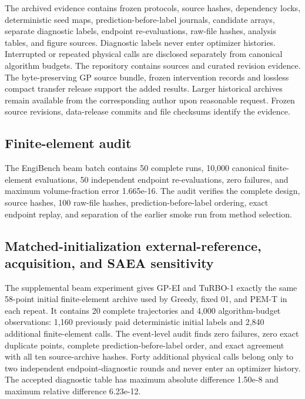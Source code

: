 \documentclass[suppldata]{interact}
\begin{document}
The archived evidence contains frozen protocols, source hashes, dependency locks, deterministic seed maps, prediction-before-label journals, candidate arrays, separate diagnostic labels, endpoint re-evaluations, raw-file hashes, analysis tables, and figure sources. Diagnostic labels never enter optimizer histories. Interrupted or repeated physical calls are disclosed separately from canonical algorithm budgets. The repository contains sources and curated revision evidence. The byte-preserving GP source bundle, frozen intervention records and lossless compact transfer release support the added results. Larger historical archives remain available from the corresponding author upon reasonable request. Frozen source revisions, data-release commits and file checksums identify the evidence.

\hypertarget{finite-element-audit}{%
\subsection{Finite-element audit}\label{finite-element-audit}}

The EngiBench beam batch contains 50 complete runs, 10,000 canonical finite-element evaluations, 50 independent endpoint re-evaluations, zero failures, and maximum volume-fraction error 1.665e-16. The audit verifies the complete design, source hashes, 100 raw-file hashes, prediction-before-label ordering, exact endpoint replay, and separation of the earlier smoke run from method selection.

\hypertarget{matched-initialization-external-reference-acquisition-and-saea-sensitivity}{%
\subsection{Matched-initialization external-reference, acquisition, and SAEA sensitivity}\label{matched-initialization-external-reference-acquisition-and-saea-sensitivity}}

The supplemental beam experiment gives GP-EI and TuRBO-1 exactly the same 58-point initial finite-element archive used by Greedy, fixed 01, and PEM-T in each repeat. It contains 20 complete trajectories and 4,000 algorithm-budget observations: 1,160 previously paid deterministic initial labels and 2,840 additional finite-element calls. The event-level audit finds zero failures, zero exact duplicate points, complete prediction-before-label order, and exact agreement with all ten source-archive hashes. Forty additional physical calls belong only to two independent endpoint-diagnostic rounds and never enter an optimizer history. The accepted diagnostic table has maximum absolute difference 1.50e-8 and maximum relative difference 6.23e-12.
\end{document}
